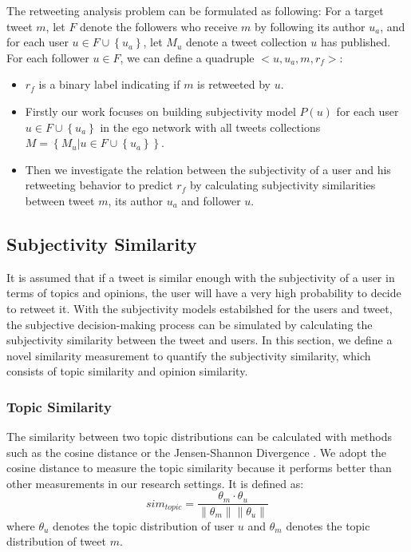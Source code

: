 \documentclass[letterpaper]{article}
\begin{document}
The retweeting analysis problem can be formulated as following:
For a target tweet $ m $, let $ F $ denote the followers who receive $ m $ by following its author $ u_{a} $, and for each user $ u \in F \cup \left\lbrace u_{a} \right\rbrace  $, let $ M_{u} $ denote a tweet collection $ u $ has published. 
For each follower $ u \in F $, we can define a quadruple $ <u, u_{a}, m, r_{f}>  $: 
\begin{itemize}
\item $ r_{f} $ is a binary label indicating if $ m $ is retweeted by $ u $.
\item Firstly our work focuses on building subjectivity model $ P\left( u \right)  $ for each user $ u \in F \cup \left\lbrace u_{a} \right\rbrace $ in the ego network with all tweets collections $ M=\left\lbrace M_{u} | u \in F \cup \left\lbrace u_{a} \right\rbrace  \right\rbrace  $.
\item Then we investigate the relation between the subjectivity of a user and his retweeting behavior to predict $ r_{f} $ by calculating subjectivity similarities between tweet $ m $, its author $ u_{a} $ and follower $ u $. 
\end{itemize}

\subsection{Subjectivity Similarity}
\label{similarity}

It is assumed that if a tweet is similar enough with the subjectivity of a user in terms of topics and opinions, the user will have a very high probability to decide to retweet it. 
With the subjectivity models estabilshed for the users and tweet, the subjective decision-making process can be simulated by calculating the subjectivity similarity between the tweet and users. 
In this section, we define a novel similarity measurement to quantify the subjectivity similarity, which consists of topic similarity and opinion similarity. 
 
\subsubsection{Topic Similarity}
\label{topsim}

The similarity between two topic distributions can be calculated with methods such as the cosine distance \cite{cha2007comprehensive} or the Jensen-Shannon Divergence \cite{weng2010twitterrank}.
We adopt the cosine distance to measure the topic similarity because it performs better than other measurements in our research settings. It is defined as:
\begin{equation}
sim_{topic}=\dfrac{\theta_{m} \cdot \theta_{u}}{\parallel \theta_{m} \parallel \parallel \theta_{u} \parallel}
\end{equation}
where $ \theta_{u}$ denotes the topic distribution of user $ u $ and $\theta_{m}$ denotes the topic distribution of tweet $ m $. 
\end{document}
